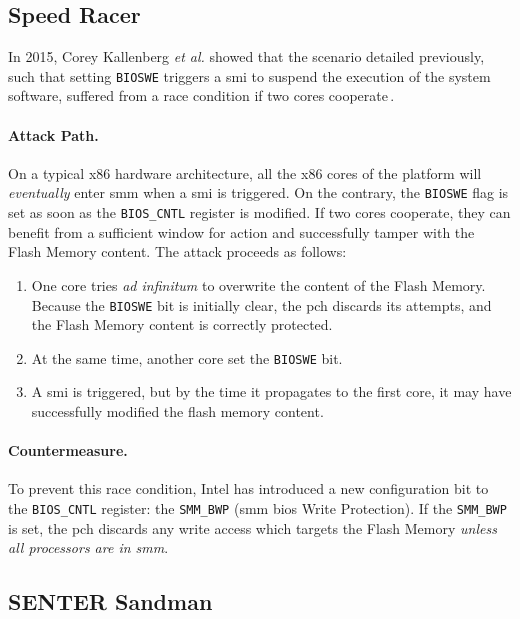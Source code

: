 \subsection{Speed Racer}
\label{subsec:usecase:hse:speed}

In 2015, Corey Kallenberg \emph{et al.} showed that the scenario detailed
previously, such that setting \texttt{BIOSWE} triggers a \ac{smi} to suspend the
execution of the system software, suffered from a race condition if two cores
cooperate\,\cite{kallenberg2015racecondition}.

\paragraph{Attack Path.}
%
On a typical x86 hardware architecture, all the x86 cores of the platform will
\emph{eventually} enter \ac{smm} when a \ac{smi} is triggered.
%
On the contrary, the \texttt{BIOSWE} flag is set as soon as the
\texttt{BIOS\_CNTL} register is modified.
%
If two cores cooperate, they can benefit from a sufficient window for action and
successfully tamper with the Flash Memory content.
%
The attack proceeds as follows:

\begin{enumerate}
\item One core tries \emph{ad infinitum} to overwrite the content of the Flash
  Memory.
  Because the \texttt{BIOSWE} bit is initially clear, the \ac{pch} discards its
  attempts, and the Flash Memory content is correctly protected.
%
\item At the same time, another core set the \texttt{BIOSWE} bit.
%
\item A \ac{smi} is triggered, but by the time it propagates to the first core,
  it may have successfully modified the flash memory content.
%
\end{enumerate}

\paragraph{Countermeasure.}
%
To prevent this race condition, Intel has introduced a new configuration bit to
the \texttt{BIOS\_CNTL} register: the \texttt{SMM\_BWP} (\ac{smm} \ac{bios}
Write Protection).
%
If the \texttt{SMM\_BWP} is set, the \ac{pch} discards any write access which
targets the Flash Memory \emph{unless all processors are in \ac{smm}}.

\subsection{SENTER Sandman}
\label{subsec:usecase:hse:sandman}

